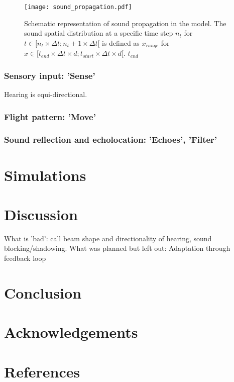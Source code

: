 \documentclass[12pt]{article}
\begin{document}
\begin{figure}[!h]
\centering
\texttt{[image: sound\_propagation.pdf]}
\caption{Schematic representation of sound propagation in the model. The sound spatial distribution at a specific time step $n_t$ for $t\in [n_t\times\Delta t; n_t+1\times\Delta t[$ is defined as $x_{range}$ for $x\in [t_{end}\times\Delta t\times d; t_{start}\times\Delta t\times d[$. $t_{end}$ }
\label{soundprop}
\end{figure}

\subsubsection{Sensory input: 'Sense'}

Hearing is equi-directional.

\subsubsection{Flight pattern: 'Move'}

\subsubsection{Sound reflection and echolocation: 'Echoes', 'Filter'}

\section{Simulations}

\section{Discussion}

What is 'bad': call beam shape and directionality of hearing, sound blocking/shadowing.
What was planned but left out: Adaptation through feedback loop

\section{Conclusion}

\section{Acknowledgements}

\section{References}
{}

\end{document}
